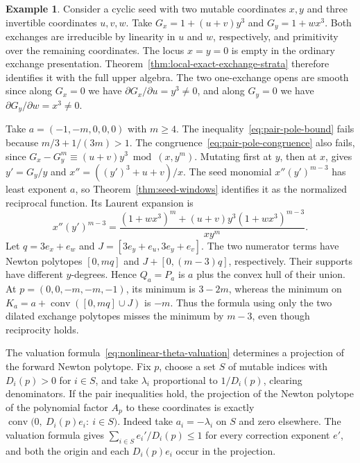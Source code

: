 \documentclass[11pt,reqno]{amsart}
\numberwithin{equation}{section}
\theoremstyle{definition}
\newtheorem{example}[theorem]{Example}
\theoremstyle{remark}
\begin{document}
\begin{example}\label{ex:cyclic-unequal-poles}
Consider a cyclic seed with two mutable coordinates \(x,y\) and
three invertible coordinates \(u,v,w\). Take
\(G_x=1+(u+v)y^3\) and \(G_y=1+wx^3\). Both exchanges are irreducible
by linearity in \(u\) and \(w\), respectively, and primitivity over the
remaining coordinates. The locus \(x=y=0\) is empty in the ordinary
exchange presentation. Theorem~\ref{thm:local-exact-exchange-strata}
therefore identifies it with the full upper algebra. The two one-exchange
opens are smooth since along \(G_x=0\) we have
\(\partial G_x/\partial u=y^3\ne0\), and along \(G_y=0\) we have
\(\partial G_y/\partial w=x^3\ne0\).

Take \(a=(-1,-m,0,0,0)\) with \(m\ge4\). The inequality~\eqref{eq:pair-pole-bound} fails because
\(m/3+1/(3m)>1\). The congruence~\eqref{eq:pair-pole-congruence} also fails, since
\(G_x-G_y^m\equiv (u+v)y^3\bmod (x,y^m)\).
Mutating first at \(y\), then at \(x\), gives \(y'=G_y/y\) and
\(x''=((y')^3+u+v)/x\). The seed monomial \(x''(y')^{m-3}\) has least
exponent \(a\), so Theorem~\ref{thm:seed-windows} identifies it as the
normalized reciprocal function. Its Laurent expansion is
\[ x''(y')^{m-3}=\frac{(1+wx^3)^m+(u+v)y^3(1+wx^3)^{m-3}}{xy^m}. \]
Let \(q=3e_x+e_w\) and \(J=[3e_y+e_u,3e_y+e_v]\).
The two numerator terms have Newton polytopes \([0,mq]\) and
\(J+[0,(m-3)q]\), respectively. Their supports have different
\(y\)-degrees. Hence \(Q_a=P_a\) is \(a\) plus the convex hull of their
union. At \(p=(0,0,-m,-m,-1)\), its minimum is \(3-2m\), whereas the
minimum on \(K_a=a+\operatorname{conv}([0,mq]\cup J)\) is \(-m\).
Thus the formula using only the two dilated exchange polytopes misses
the minimum by \(m-3\), even though reciprocity holds.
\end{example}

The valuation formula~\eqref{eq:nonlinear-theta-valuation} determines a projection of the forward Newton
polytope. Fix \(p\), choose a set \(S\) of mutable indices with
\(D_i(p)>0\) for \(i\in S\), and take
\(\lambda_i\) proportional to \(1/D_i(p)\), clearing denominators.
If the pair inequalities hold, the projection of the Newton polytope
of the polynomial factor \(A_p\) to these coordinates is exactly
\(\operatorname{conv}\bigl(0,\ D_i(p)e_i:\ i\in S\bigr)\).
Indeed take \(a_i=-\lambda_i\) on \(S\) and zero elsewhere.
The valuation formula gives \(\sum_{i\in S}e_i'/D_i(p)\le1\) for
every correction exponent \(e'\), and both the origin and each \(D_i(p)e_i\) occur in the projection.
\end{document}

